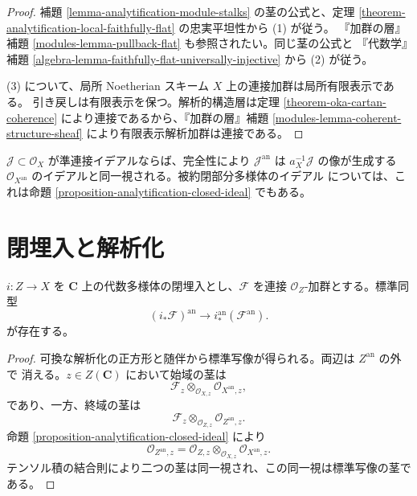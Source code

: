 \begin{proof}
補題 \ref{lemma-analytification-module-stalks} の茎の公式と、定理
\ref{theorem-analytification-local-faithfully-flat} の忠実平坦性から (1) が従う。
『加群の層』補題 \ref{modules-lemma-pullback-flat} も参照されたい。同じ茎の公式と
『代数学』補題 \ref{algebra-lemma-faithfully-flat-universally-injective} から (2) が従う。

(3) について、局所 Noetherian スキーム $X$ 上の連接加群は局所有限表示である。
引き戻しは有限表示を保つ。解析的構造層は定理
\ref{theorem-oka-cartan-coherence} により連接であるから、『加群の層』補題
\ref{modules-lemma-coherent-structure-sheaf} により有限表示解析加群は連接である。
\end{proof}

\begin{remark}[イデアルの解析化]
\label{remark-analytification-ideal-sheaf}
$\mathcal J\subset\mathcal O_X$ が準連接イデアルならば、完全性により
$\mathcal J^{\mathrm{an}}$ は $a_X^{-1}\mathcal J$ の像が生成する
$\mathcal O_{X^{\mathrm{an}}}$ のイデアルと同一視される。被約閉部分多様体のイデアル
については、これは命題 \ref{proposition-analytification-closed-ideal} でもある。
\end{remark}


\section{閉埋入と解析化}
\label{section-analytification-closed-immersions}

\begin{lemma}
\label{lemma-analytification-pushforward-closed-immersion}
\begin{reference}
\cite[\S 3、第10項、命題11]{GAGA}
\end{reference}
$i:Z\to X$ を $\mathbf C$ 上の代数多様体の閉埋入とし、$\mathcal F$ を連接
$\mathcal O_Z$-加群とする。標準同型
$$
(i_*\mathcal F)^{\mathrm{an}}
\longrightarrow i^{\mathrm{an}}_*(\mathcal F^{\mathrm{an}}).
$$
が存在する。
\end{lemma}

\begin{proof}
可換な解析化の正方形と随伴から標準写像が得られる。両辺は $Z^{\mathrm{an}}$ の外で
消える。$z\in Z(\mathbf C)$ において始域の茎は
$$
\mathcal F_z\otimes_{\mathcal O_{X,z}}
\mathcal O_{X^{\mathrm{an}},z},
$$
であり、一方、終域の茎は
$$
\mathcal F_z\otimes_{\mathcal O_{Z,z}}
\mathcal O_{Z^{\mathrm{an}},z}.
$$
命題 \ref{proposition-analytification-closed-ideal} により
$$
\mathcal O_{Z^{\mathrm{an}},z}
=\mathcal O_{Z,z}\otimes_{\mathcal O_{X,z}}
\mathcal O_{X^{\mathrm{an}},z}.
$$
テンソル積の結合則により二つの茎は同一視され、この同一視は標準写像の茎である。
\end{proof}


